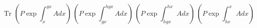 \begin{equation}
\mbox{Tr }
\left( P \exp \int_x^{gx} A dx \right) \,
\left( P \exp \int_{gx}^{hgx} A dx \right) \,
\left( P \exp \int_{hgx}^{hx} A dx \right) \,
\left( P \exp \int_{hx}^x A dx \right)
\end{equation}

